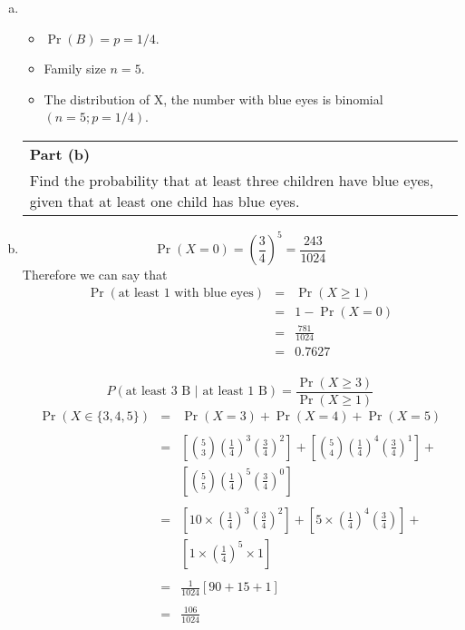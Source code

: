 \documentclass[a4paper,12pt]{article}
\begin{document}
\begin{enumerate}[(a)]
\item 
\begin{itemize}
    \item $\Pr(B) = p = 1/4$. 
    \item Family size $n = 5$. 
\item The distribution of X, the number with blue
eyes is binomial $(n = 5; p = 1/4)$.
\end{itemize}

\newpage
  \begin{table}[ht!]
     \centering
     \begin{tabular}{|p{15cm}|}
     \hline  
\noindent \textbf{Part (b)}\\ 
\large Find the probability that at least three children have blue eyes, given that at least one child has blue eyes. \\ \hline 
      \end{tabular}
    \end{table}
\item \[\Pr(X=0) = \left(\frac{3}{4}\right)^5 = \frac{243}{1024} \] 
Therefore we can say that
\begin{eqnarray*}
\Pr(\mbox{at least 1 with blue eyes}) 
&=& \Pr(X\geq 1) \\
&=& 1 - \Pr(X=0)\\ 
&=& \frac{781}{1024}\\
&=& 0.7627\\
\end{eqnarray*}


\[
P(\mbox{at least 3 B } | \mbox{ at least 1 B})= \frac{\Pr(X \geq 3)}{\Pr( X \geq 1)}
\]
\begin{eqnarray*}
\Pr(X \in \{3,4,5\}) &=&  \Pr(X=3) + \Pr(X=4) + \Pr(X=5)\\\\
&=& \left[ {5 \choose 3} \left(\frac{1}{4}\right)^3  \left(\frac{3}{4}\right)^2 \right]+ 
    \left[ {5 \choose 4} \left(\frac{1}{4}\right)^4  \left(\frac{3}{4}\right)^1 \right]+ \\
& &    \left[ {5 \choose 5} \left(\frac{1}{4}\right)^5  \left(\frac{3}{4}\right)^0\right]\\\\
&=& \left[ 10 \times \left(\frac{1}{4}\right)^3  \left(\frac{3}{4}\right)^2\right] + 
    \left[ 5 \times \left(\frac{1}{4}\right)^4  \left(\frac{3}{4}\right)\right] + \\
& &    \left[ 1 \times \left(\frac{1}{4}\right)^5  \times 1 \right]\\\\
&=& \frac{1}{1024} \left[ 90 + 15 + 1 \right] \\
& & \\
&=& \frac{106}{1024}
\end{eqnarray*}


\end{enumerate}
\end{document}

